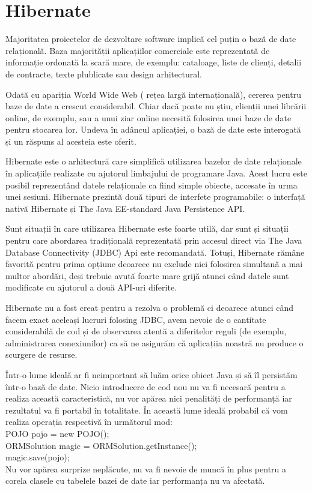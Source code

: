 \documentclass[12pt]{book}
\begin{document}
\section{Hibernate}
Majoritatea proiectelor de dezvoltare software implică cel puțin o bază de date relațională. Baza majorității aplicațiilor comerciale este reprezentată de informație ordonată la scară mare, de exemplu: cataloage, liste de clienți, detalii de contracte, texte plublicate sau design arhitectural.

Odată cu apariția World Wide Web ( rețea largă internațională), cererea pentru baze de date a crescut considerabil. Chiar dacă poate nu știu, clienții unei librării online, de exemplu, sau a unui ziar online necesită folosirea unei baze de date pentru stocarea lor. Undeva în adâncul aplicației, o bază de date este interogată și un răspuns al acesteia este oferit. 

Hibernate este o arhitectură care simplifică utilizarea bazelor de date relaționale în aplicațiile realizate cu ajutorul limbajului de programare Java. Acest lucru este posibil reprezentând datele relaționale ca fiind simple obiecte, accesate în urma unei sesiuni. Hibernate prezintă două tipuri de interfete programabile: o interfață nativă Hibernate și The Java EE-standard Java Persistence API. 

Sunt situații în care utilizarea Hibernate este foarte utilă, dar sunt și situații pentru care abordarea tradițională reprezentată prin accesul direct via The Java Database Connectivity (JDBC) Api este recomandată. Totuși, Hibernate rămâne favorită pentru prima opțiune deoarece nu exclude nici folosirea simultană a mai multor abordări, deși trebuie avută foarte mare grijă atunci când datele sunt modificate cu ajutorul a două API-uri diferite.

Hibernate nu a fost creat pentru a rezolva o problemă ci deoarece atunci când facem exact aceleași lucruri folosing JDBC, avem nevoie de o cantitate considerabilă de cod și de observarea atentă a diferitelor reguli (de exemplu, administrarea conexiunilor) ca să ne asigurăm că aplicațiia noastră nu produce o scurgere de resurse. 

	

Într-o lume ideală ar fi neimportant să luăm orice obiect Java și să îl persistăm într-o bază de date. Nicio introducere de cod nou nu va fi necesară pentru a realiza această caracteristică, nu vor apărea nici penalități de performanță iar rezultatul va fi portabil în totalitate. În această lume ideală probabil că vom realiza operația respectivă în următorul mod:\\
POJO pojo = new POJO();\\
ORMSolution magic = ORMSolution.getInstance();\\
magic.save(pojo);\\
Nu vor apărea surprize neplăcute, nu va fi nevoie de muncă în plus pentru a corela clasele cu tabelele bazei de date iar performanța nu va afectată.\cite{BeginningHibernate}
\end{document}
